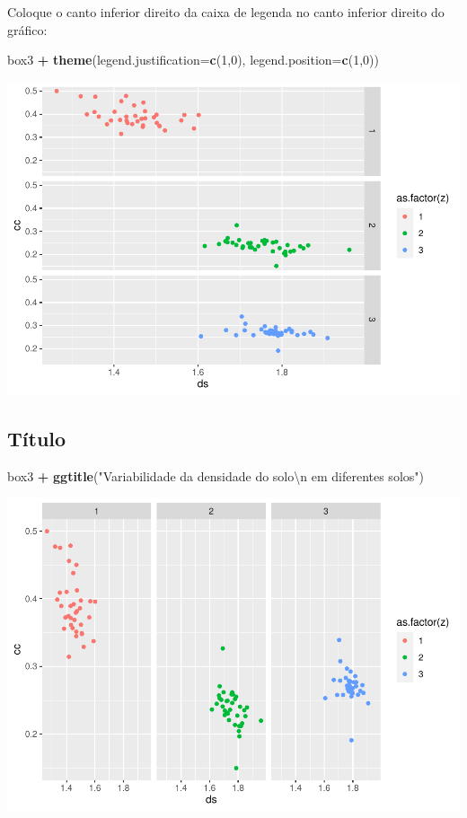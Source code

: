 \documentclass[
]{book}
\newenvironment{Shaded}{\begin{snugshade}}{\end{snugshade}}
\newcommand{\CharTok}[1]{\textcolor[rgb]{0.31,0.60,0.02}{#1}}
\newcommand{\DataTypeTok}[1]{\textcolor[rgb]{0.13,0.29,0.53}{#1}}
\newcommand{\DecValTok}[1]{\textcolor[rgb]{0.00,0.00,0.81}{#1}}
\newcommand{\KeywordTok}[1]{\textcolor[rgb]{0.13,0.29,0.53}{\textbf{#1}}}
\newcommand{\NormalTok}[1]{#1}
\newcommand{\OperatorTok}[1]{\textcolor[rgb]{0.81,0.36,0.00}{\textbf{#1}}}
\newcommand{\StringTok}[1]{\textcolor[rgb]{0.31,0.60,0.02}{#1}}
\begin{document}
Coloque o canto inferior direito da caixa de legenda no canto inferior direito do gráfico:

\begin{Shaded}
\begin{Highlighting}[]
\NormalTok{box3 }\OperatorTok{+}\StringTok{ }\KeywordTok{theme}\NormalTok{(}\DataTypeTok{legend.justification=}\KeywordTok{c}\NormalTok{(}\DecValTok{1}\NormalTok{,}\DecValTok{0}\NormalTok{), }\DataTypeTok{legend.position=}\KeywordTok{c}\NormalTok{(}\DecValTok{1}\NormalTok{,}\DecValTok{0}\NormalTok{))}
\end{Highlighting}
\end{Shaded}

\includegraphics{TudodoR_files/figure-latex/unnamed-chunk-220-1.pdf}

\hypertarget{tuxedtulo}{%
\subsection{Título}\label{tuxedtulo}}

\begin{Shaded}
\begin{Highlighting}[]
\NormalTok{box3 }\OperatorTok{+}\StringTok{ }\KeywordTok{ggtitle}\NormalTok{(}\StringTok{"Variabilidade da densidade do solo}\CharTok{\textbackslash{}n}\StringTok{ em diferentes solos"}\NormalTok{)}
\end{Highlighting}
\end{Shaded}

\includegraphics{TudodoR_files/figure-latex/unnamed-chunk-221-1.pdf}
\end{document}
